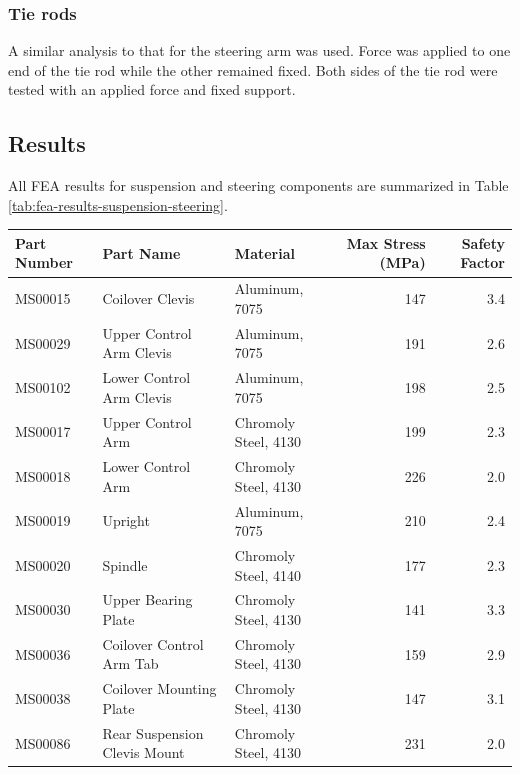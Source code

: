 \documentclass[10pt]{article}
\begin{document}
\subsubsection{Tie rods}
A similar analysis to that for the steering arm was used. Force was applied to one end of the tie rod while the other remained fixed. Both sides of the tie rod were tested with an applied force and fixed support.

\subsection{Results}
All FEA results for suspension and steering components are summarized in Table \ref{tab:fea-results-suspension-steering}.

\begin{table}
\centering
\begin{tabular}{lllrr}
\toprule
Part Number & Part Name                    & Material             & Max Stress (\si{\mega\pascal}) & Safety Factor \\
\midrule
MS00015     & Coilover Clevis              & Aluminum, 7075       &                 147 &           3.4 \\
MS00029     & Upper Control Arm Clevis     & Aluminum, 7075       &                 191 &           2.6 \\
MS00102     & Lower Control Arm Clevis     & Aluminum, 7075       &                 198 &           2.5 \\
MS00017     & Upper Control Arm            & Chromoly Steel, 4130 &                 199 &           2.3 \\
MS00018     & Lower Control Arm            & Chromoly Steel, 4130 &                 226 &           2.0 \\
MS00019     & Upright                      & Aluminum, 7075       &                 210 &           2.4 \\
MS00020     & Spindle                      & Chromoly Steel, 4140 &                 177 &           2.3 \\
MS00030     & Upper Bearing Plate          & Chromoly Steel, 4130 &                 141 &           3.3 \\
MS00036     & Coilover Control Arm Tab     & Chromoly Steel, 4130 &                 159 &           2.9 \\
MS00038     & Coilover Mounting Plate      & Chromoly Steel, 4130 &                 147 &           3.1 \\
MS00086     & Rear Suspension Clevis Mount & Chromoly Steel, 4130 &                 231 &           2.0 \\

\end{tabular}
\end{table}
\end{document}
